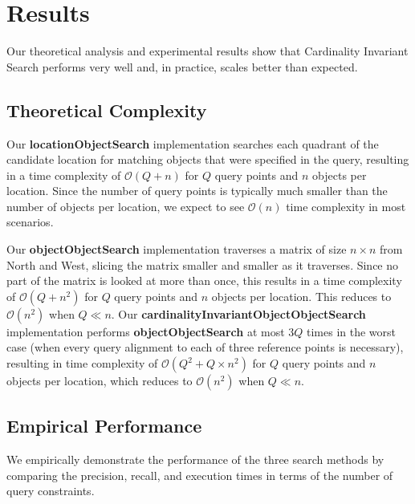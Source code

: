 \section{Results}
\label{section:results}

Our theoretical analysis and experimental results show that Cardinality Invariant Search performs very well and, in practice, scales better than expected.

\subsection{Theoretical Complexity}

Our \textbf{locationObjectSearch} implementation searches each quadrant of the candidate location for matching objects that were specified in the query, resulting in a time complexity of $\mathcal{O}(Q + n)$ for $Q$ query points and $n$ objects per location. 
Since the number of query points is typically much smaller than the number of objects per location, we expect to see $\mathcal{O}(n)$ time complexity in most scenarios.

Our \textbf{objectObjectSearch} implementation traverses a matrix of size $n \times n$ from North and West, slicing the matrix smaller and smaller as it traverses. 
Since no part of the matrix is looked at more than once, this results in a time complexity of $\mathcal{O}(Q + n^2)$ for $Q$ query points and $n$ objects per location. 
This reduces to $\mathcal{O}(n^2)$ when $Q \ll n$. 
Our \textbf{cardinalityInvariantObjectObjectSearch} implementation performs \textbf{objectObjectSearch} at most $3Q$ times in the worst case (when every query alignment to each of three reference points is necessary), resulting in time complexity of $\mathcal{O}(Q^2 + Q\times n^2)$ for $Q$ query points and $n$ objects per location, which reduces to $\mathcal{O}(n^2)$ when $Q \ll n$. 


\subsection{Empirical Performance}
We empirically demonstrate the performance of the three search methods by comparing the precision, recall, and execution times in terms of the number of query constraints. 


